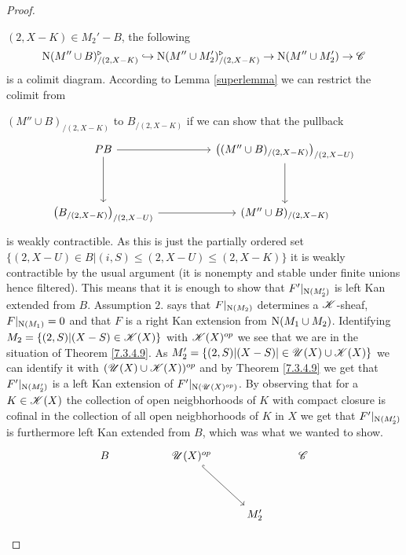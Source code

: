 \documentclass[../../thesis.tex]{subfiles}
\begin{document}
\begin{proof}
\begin{enumerate}[label=(\alph*)]
              $(2,X-K)\in M_2' - B$, the following
              \[
                  \mathrm{N}(M'' \cup B)^{\triangleright}_{/(2,X-K)} \hookrightarrow  \mathrm{N}(M'' \cup M_2')^{\triangleright}_{/(2,X-K)} \to \mathrm{N}(M''\cup M_2') \to \mathscr{C}
              \]
              is a colimit diagram.
              According to Lemma \ref{superlemma} we can restrict the colimit from

              $(M''\cup B)_{/(2,X-K)}$ to $B_{/(2,X-K)}$ if we can show that the pullback
              \[\begin{tikzcd}
                      PB && {\left((M''\cup B)_{/(2,X-K)}\right)_{/(2,X-U)}} \\
                      \\
                      {\left(B_{/(2,X-K)}\right)_{/(2,X-U)}} && {(M''\cup B)_{/(2,X-K)}}
                      \arrow[from=1-1, to=1-3]
                      \arrow[from=1-3, to=3-3]
                      \arrow[from=3-1, to=3-3]
                      \arrow[from=1-1, to=3-1]
                  \end{tikzcd}\]
              is weakly contractible.
              As this is just the partially ordered set $\{(2,X-U)\in B | (i,S) \leq (2,X-U) \leq (2,X-K)\}$ it is weakly contractible by the usual argument (it is nonempty and stable under finite unions hence filtered).
              This means that it is enough to show that $F'|_{\mathrm{N}(M_2')}$ is left Kan extended from $B$.
              Assumption $2.$ says that $F|_{\mathrm{N}(M_2)}$ determines a $\mathscr{K}$-sheaf, $F|_{\mathrm{N}(M_1)}=0$ and that $F$ is a right Kan extension from $\mathrm{N}(M_1 \cup M_2)$.
              Identifying $M_2 = \{(2, S) | (X-S) \in \mathscr{K}(X)\}$ with $\mathscr{K}(X)^{op}$ we see that we are in the situation of Theorem \ref{7.3.4.9}.
              As $M_2' = \{(2,S) | (X-S) | \in \mathscr{U}(X) \cup \mathscr{K}(X)\}$ we can identify it with $(\mathscr{U}(X) \cup \mathscr{K}(X))^{op}$ and by Theorem \ref{7.3.4.9} we get that $F'|_{\mathrm{N}(M_2')}$ is a left Kan extension of $F'|_{\mathrm{N}(\mathscr{U}(X)^{op})}$.
              By observing that for a $K \in \mathscr{K}(X)$ the collection of open neigbhorhoods of $K$ with compact closure is cofinal in the collection of all open neigbhorhoods of $K$ in $X$ we get that $F'|_{\mathrm{N}(M_2')}$ is furthermore left Kan extended from $B$, which was what we wanted to show.
              \[\begin{tikzcd}
                      B && {\Open(X)^{op}} && \C \\
                      \\
                      &&& {M_2'}
                      \arrow[hook, from=1-3, to=3-4]

\end{tikzcd}\]
\end{enumerate}
\end{proof}
\end{document}
